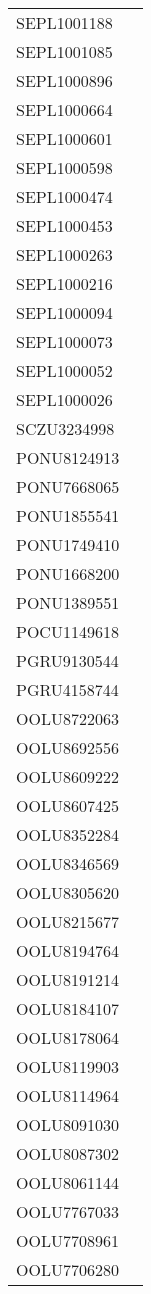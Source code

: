 \documentclass[a4paper]{report}
\begin{document}
\begin{longtable}{| p{4cm} | p{10cm} |}
	SEPL1001188  &  \\
	SEPL1001085  &  \\
	SEPL1000896  &  \\
	SEPL1000664  &  \\
	SEPL1000601  &  \\
	SEPL1000598  &  \\
	SEPL1000474  &  \\
	SEPL1000453  &  \\
	SEPL1000263  &  \\
	SEPL1000216  &  \\
	SEPL1000094  &  \\
	SEPL1000073  &  \\
	SEPL1000052  &  \\
	SEPL1000026  &  \\
	SCZU3234998  &  \\
	PONU8124913  &  \\
	PONU7668065  &  \\
	PONU1855541  &  \\
	PONU1749410  &  \\
	PONU1668200  &  \\
	PONU1389551  &  \\
	POCU1149618  &  \\
	PGRU9130544  &  \\
	PGRU4158744  &  \\
	OOLU8722063  &  \\
	OOLU8692556  &  \\
	OOLU8609222  &  \\
	OOLU8607425  &  \\
	OOLU8352284  &  \\
	OOLU8346569  &  \\
	OOLU8305620  &  \\
	OOLU8215677  &  \\
	OOLU8194764  &  \\
	OOLU8191214  &  \\
	OOLU8184107  &  \\
	OOLU8178064  &  \\
	OOLU8119903  &  \\
	OOLU8114964  &  \\
	OOLU8091030  &  \\
	OOLU8087302  &  \\
	OOLU8061144  &  \\
	OOLU7767033  &  \\
	OOLU7708961  &  \\
	OOLU7706280  &  \\

\end{longtable}
\end{document}
